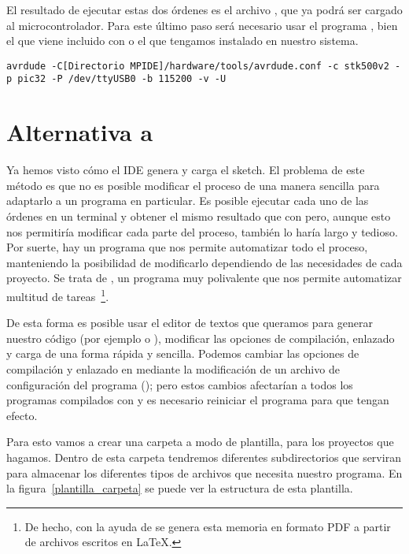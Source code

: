 El resultado de ejecutar estas dos órdenes es el archivo , que ya podrá ser cargado al microcontrolador.
Para este último paso será necesario usar el programa , bien el que viene incluido con  o el que tengamos instalado en nuestro sistema.
\begin{lstlisting}[breaklines=true]
avrdude -C[Directorio MPIDE]/hardware/tools/avrdude.conf -c stk500v2 -p pic32 -P /dev/ttyUSB0 -b 115200 -v -U
\end{lstlisting}

\section{Alternativa a }

Ya hemos visto cómo el IDE genera y carga el sketch. El problema de este método es que no es posible modificar el proceso de una manera sencilla para adaptarlo a un programa en particular. Es posible ejecutar cada uno de las órdenes en un terminal y obtener el mismo resultado que con  pero, aunque esto nos permitiría modificar cada parte del proceso, también lo haría largo y tedioso. Por suerte, hay un programa que nos permite automatizar todo el proceso, manteniendo la posibilidad de modificarlo dependiendo de las necesidades de cada proyecto. Se trata de , un programa muy polivalente que nos permite automatizar multitud de tareas~\footnote{De hecho, con la ayuda de  se genera esta memoria en formato PDF a partir de archivos escritos en \LaTeX.}.

De esta forma es posible usar el editor de textos que queramos para generar nuestro código (por ejemplo  o ), modificar las opciones de compilación, enlazado y carga de una forma rápida y sencilla. Podemos cambiar las opciones de compilación y enlazado en  mediante la modificación de un archivo de configuración del programa (); pero estos cambios afectarían a todos los programas compilados con  y es necesario reiniciar el programa para que tengan efecto. 

Para esto vamos a crear una carpeta a modo de plantilla, para los proyectos que hagamos. Dentro de esta carpeta tendremos diferentes subdirectorios que serviran para almacenar los diferentes tipos de archivos que necesita nuestro programa. En la figura~\ref{plantilla_carpeta} se puede ver la estructura de esta plantilla.

